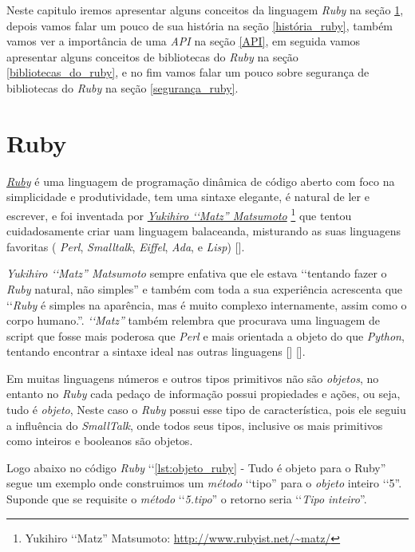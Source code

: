 Neste capitulo iremos apresentar alguns conceitos da linguagem \emph{Ruby} na seção \ref{ruby},
depois vamos falar um pouco de sua história na seção \ref{história_ruby}, também vamos ver
a importância de uma \emph{API} na seção \ref{API}, em seguida vamos apresentar alguns conceitos
de bibliotecas do \emph{Ruby} na seção \ref{bibliotecas_do_ruby}, e no fim vamos falar um pouco
sobre segurança de bibliotecas do \emph{Ruby} na seção \ref{segurança_ruby}.

\section{Ruby}
\label{ruby}

\emph{\href{https://www.ruby-lang.org/en/}{Ruby}} é uma linguagem de programação
dinâmica de código aberto com foco na simplicidade e produtividade, tem uma sintaxe elegante, é natural de
ler e escrever, e foi inventada por \emph{ \href{http://www.rubyist.net/~matz/}{Yukihiro ‘‘Matz'' Matsumoto}}
\footnote{Yukihiro ‘‘Matz'' Matsumoto: \url{http://www.rubyist.net/~matz/}}
que tentou cuidadosamente criar uam linguagem balaceanda, misturando as suas linguagens favoritas
( \emph{Perl}, \emph{Smalltalk}, \emph{Eiffel}, \emph{Ada}, e \emph{Lisp}) [].

\emph{{Yukihiro ‘‘Matz'' Matsumoto}} sempre enfativa que ele estava ‘‘tentando fazer o \emph{Ruby} natural, não simples'' e também com toda a
sua experiência acrescenta que ‘‘\emph{Ruby} é simples na aparência, mas é muito complexo internamente, assim
como o corpo humano.''. \emph{‘‘Matz''} também relembra que procurava uma linguagem de script que fosse mais
poderosa que \emph{Perl} e mais orientada a objeto do que \emph{Python}, tentando encontrar a
sintaxe ideal nas outras linguagens [] [].

Em muitas linguagens números e outros tipos primitivos não são \emph{objetos}, no entanto no \emph{Ruby}
cada pedaço de informação possui propiedades e ações, ou seja, tudo é \emph{objeto}, Neste caso o
\emph{Ruby} possui esse tipo de característica, pois ele seguiu a influência do \emph{SmallTalk}, onde
todos seus tipos, inclusive os mais primitivos como inteiros e booleanos são objetos.

Logo abaixo no código \emph{Ruby} ‘‘\ref{lst:objeto_ruby} - Tudo é objeto para o Ruby'' segue um
exemplo onde construimos um \emph{método} ‘‘tipo'' para o \emph{objeto} inteiro ‘‘5''. Suponde que se
requisite o \emph{método} ‘‘\emph{5.tipo}'' o retorno seria ‘‘\emph{Tipo inteiro}''.

